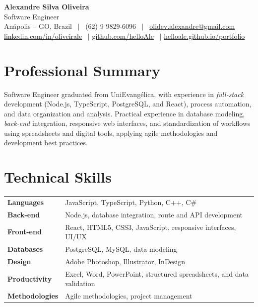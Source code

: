 \documentclass[10.5pt,a4paper]{article}
\begin{document}
\begin{center}
  {\Huge\bfseries\color{accent} Alexandre Silva Oliveira}\\[3pt]
  {\large Software Engineer}\\[4pt]
  Anápolis -- GO, Brazil \ $|$ \ (62) 9 9829-6096 \ $|$ \ \href{mailto:olidev.alexandre@gmail.com}{olidev.alexandre@gmail.com}\\[1pt]
  \href{https://www.linkedin.com/in/oliveirale}{linkedin.com/in/oliveirale} \ $|$
  \href{https://github.com/helloAle}{github.com/helloAle} \ $|$
  \href{https://helloale.github.io/portfolio}{helloale.github.io/portfolio}
\end{center}

\section{Professional Summary}
Software Engineer graduated from UniEvangélica, with experience in \textit{full-stack} development (Node.js, TypeScript, PostgreSQL, and React), process automation, and data organization and analysis. Practical experience in database modeling, \textit{back-end} integration, responsive web interfaces, and standardization of workflows using spreadsheets and digital tools, applying agile methodologies and development best practices.

\section{Technical Skills}
\begin{tabular}{@{}p{3.6cm}p{13cm}@{}}
\textbf{Languages} & JavaScript, TypeScript, Python, C++, C\#\\
\textbf{Back-end} & Node.js, database integration, route and API development\\
\textbf{Front-end} & React, HTML5, CSS3, JavaScript, responsive interfaces, UI/UX\\
\textbf{Databases} & PostgreSQL, MySQL, data modeling\\
\textbf{Design} & Adobe Photoshop, Illustrator, InDesign\\
\textbf{Productivity} & Excel, Word, PowerPoint, structured spreadsheets, and data validation\\
\textbf{Methodologies} & Agile methodologies, project management\\
\end{tabular}
\end{document}
